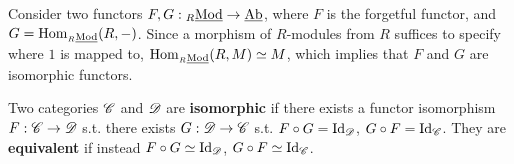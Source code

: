 \begin{example} 
    Consider two functors $F, G: {}_{R}\underline{\textup{Mod}} \to \underline{\textup{Ab}}$, where $F$ is the forgetful functor, and $G = \mathrm{Hom}_{{}_{R}\underline{\textup{Mod}}}(R, -)$. Since a morphism of $R$-modules from $R$ suffices to specify where $1$ is mapped to, $\mathrm{Hom}_{{}_{R}\underline{\textup{Mod}}}(R, M) \simeq M$, which implies that $F$ and $G$ are isomorphic functors.
\end{example}

\begin{definition}
    Two categories $\mathscr{C}$ and $\mathscr{D}$ are \textbf{isomorphic} if there exists a functor isomorphism $F: \mathscr{C} \to \mathscr{D}$ s.t. there exists $G: \mathscr{D} \to \mathscr{C}$ s.t. $F \circ G = \mathrm{Id}_{\mathscr{D}}$, $G \circ F = \mathrm{Id}_{\mathscr{C}}$. They are \textbf{equivalent} if instead $F \circ G \simeq \mathrm{Id}_{\mathscr{D}}$, $G \circ F \simeq \mathrm{Id}_{\mathscr{C}}$.
\end{definition}
